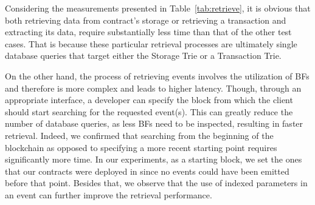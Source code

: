 Considering the measurements presented in Table~\ref{tab:retrieve}, it is obvious that both retrieving data from contract’s storage or retrieving a transaction and extracting its data, require substantially less time than that of the other test cases. That is because these particular retrieval processes are ultimately single database queries that target either the Storage Trie or a Transaction Trie. 

\begin{table}[]
\caption{Retrieval latency in Ethereum (ms)}
\label{tab:retrieve}
\centering
{}
\end{table}

On the other hand, the process of retrieving events involves the utilization of BFs and therefore is more complex and leads to higher latency. Though, through an appropriate interface, a developer can specify the block from which the client should start searching for the requested event(s). This can greatly reduce the number of database queries, as less BFs need to be inspected, resulting in faster retrieval. Indeed, we confirmed that searching from the beginning of the blockchain as opposed to specifying a more recent starting point requires significantly more time. In our experiments, as a starting block, we set the ones that our contracts were deployed in since no events could have been emitted before that point. Besides that, we observe that the use of indexed parameters in an event can further improve the retrieval performance.

